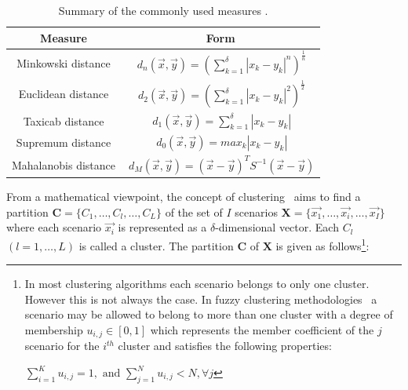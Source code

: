     \begin{table}[ht]
    \caption {\small Summary of the commonly used measures \cite{Mendelson75introduction}.}
    \centering
    \begin{tabular}{c c }
    \hline\hline
    Measure & Form \\ [0.5ex]
    \hline
    \hline
    Minkowski distance & \begin{math}\ d_{n}(\vec{x},\vec{y}) = (\displaystyle \sum_{k=1}^\delta |x_{k}-y_{k}|^{n})^{\frac{1}{n}} \end{math} \\
    Euclidean distance & \begin{math}\ d_{2}(\vec{x},\vec{y}) = (\displaystyle \sum_{k=1}^\delta |x_{k}-y_{k}|^{2})^{\frac{1}{2}} \end{math} \\
    Taxicab distance & \begin{math}\ d_{1}(\vec{x},\vec{y}) = \displaystyle \sum_{k=1}^\delta |x_{k}-y_{k}| \end{math} \\
    Supremum distance & \begin{math}\ d_{0}(\vec{x},\vec{y}) = \displaystyle max_{k} |x_{k}-y_{k}| \end{math} \\
    Mahalanobis distance & \begin{math}\ d_{M}(\vec{x},\vec{y}) = (\vec{x}-\vec{y})^{T} S^{-1} (\vec{x}-\vec{y}) \end{math} \\
    \hline
    \end{tabular}
    \label{table:tableDist}
    \end{table}

From a mathematical viewpoint, the concept of clustering~\cite{SurveyClustering} aims to find a partition $\mathbf{C}=\{C_{1},\ldots,C_{l},\ldots,{C_{L}}\}$
of the set of $I$ scenarios
    $\mathbf{X} = \{\vec{x_{1}},\ldots,\vec{x_{i}},\ldots,\vec{x_{I}}\}$
where each scenario $\vec{x_{i}}$ is represented as a $\delta$-dimensional vector.
Each $C_{l}$ $(l=1,\ldots,L)$ is called a cluster. The partition
    $ \mathbf{C} $ of $ \mathbf{X} $
is given as follows\footnote{In most clustering algorithms each scenario belongs to only one cluster. However this is not always the case. In fuzzy clustering methodologies~\cite{ZioMaio} a scenario may be allowed to belong to more than one cluster with a degree of membership
\begin{math} u_{i,j}\in [0,1] \end{math} which represents the member coefficient of the $j$ scenario for the $i^{th}$ cluster and satisfies the following properties:

$ \sum_{i=1}^{K}u_{i,j}=1,  \text{ and }  \sum_{j=1}^{N}u_{i,j}<N, \forall j $}:

